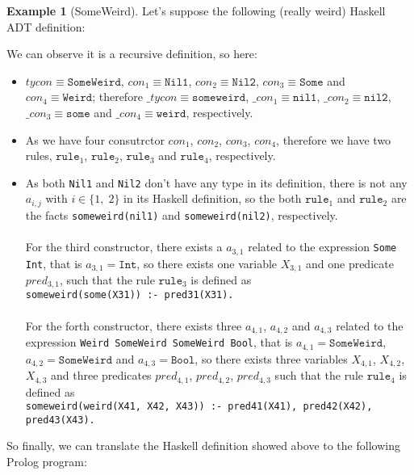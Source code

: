\documentclass{report}
\theoremstyle{definition}
\newtheorem{example}{Example}[section]
\theoremstyle{definition}
\newcommand{\ttt}[1]{\texttt{#1}}
\begin{document}
\begin{example}[SomeWeird]
	Let's suppose the following (really weird) Haskell ADT definition:
	
	We can observe it is a recursive definition, so here:
	\begin{itemize}
		\item $tycon \equiv \ttt{SomeWeird}$, $con_1 \equiv \ttt{Nil1}$, $con_2 \equiv \ttt{Nil2}$, $con_3 \equiv \ttt{Some}$ and $con_4 \equiv \ttt{Weird}$; therefore $\_tycon \equiv \ttt{someweird}$, $\_con_1 \equiv \ttt{nil1}$, $\_con_2 \equiv \ttt{nil2}$, $\_con_3 \equiv \ttt{some}$ and $\_con_4 \equiv \ttt{weird}$, respectively.
		\item As we have four consutrctor $con_1$, $con_2$, $con_3$, $con_4$, therefore we have two rules, $\ttt{rule}_1$, $\ttt{rule}_2$, $\ttt{rule}_3$ and $\ttt{rule}_4$, respectively.
		\item As both \ttt{Nil1} and \ttt{Nil2} don't have any type in its definition, there is not any $a_{i,j}$ with $i \in \{ 1,\; 2 \}$ in its Haskell definition, so the both $\ttt{rule}_1$ and $\ttt{rule}_2$ are the facts \ttt{someweird(nil1)} and \ttt{someweird(nil2)}, respectively.\\\\
		For the third constructor, there exists a $a_{3,1}$ related to the expression \ttt{Some Int}, that is $a_{3,1} = \ttt{Int}$, so there exists one variable $X_{3,1}$ and one predicate $pred_{3,1}$, such that the rule $\ttt{rule}_3$ is defined as \\ \ttt{someweird(some(X31)) :- pred31(X31).}\\\\
		For the forth constructor, there exists three $a_{4,1}$, $a_{4,2}$ and $a_{4,3}$ related to the expression \ttt{Weird SomeWeird SomeWeird Bool}, that is $a_{4,1} = \ttt{SomeWeird}$, $a_{4,2} = \ttt{SomeWeird}$ and $a_{4,3} = \ttt{Bool}$, so there exists three variables $X_{4,1}$, $X_{4,2}$, $X_{4,3}$ and three predicates $pred_{4,1}$, $pred_{4,2}$, $pred_{4,3}$ such that the rule $\ttt{rule}_4$ is defined as \\ \ttt{someweird(weird(X41, X42, X43)) :- pred41(X41), pred42(X42), pred43(X43).}
	\end{itemize}
	So finally, we can translate the Haskell definition showed above to the following Prolog program:\\
\begin{lstlisting}[language=Prolog]

\end{lstlisting}
\end{example}
\end{document}
